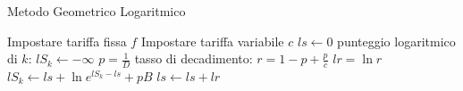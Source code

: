 \begin{algorithm}
    \caption{Metodo Geometrico Logaritmico}
    \label{alg_metodo_geometrico_log}
    \begin{algorithmic}
      \STATE Impostare tariffa fissa $f$
      \STATE Impostare tariffa variabile $c$
        \STATE $ls \leftarrow 0$
          \STATE punteggio logaritmico di $k$: $lS_k \leftarrow -\infty$
        \ENDFOR
        \REPEAT
            \STATE $p = \frac{1}{D}$
            \STATE tasso di decadimento: $r = 1 - p + \frac{p}{c}$
            \STATE $lr = \ln{r}$
          \ENDIF
            \STATE $lS_k \leftarrow ls + \ln{e^{lS_k - ls} + pB}$
            \STATE $ls \leftarrow ls + lr$
          \ENDIF
        \ENDFOR
      \ENDFOR
    \end{algorithmic}
\end{algorithm}
